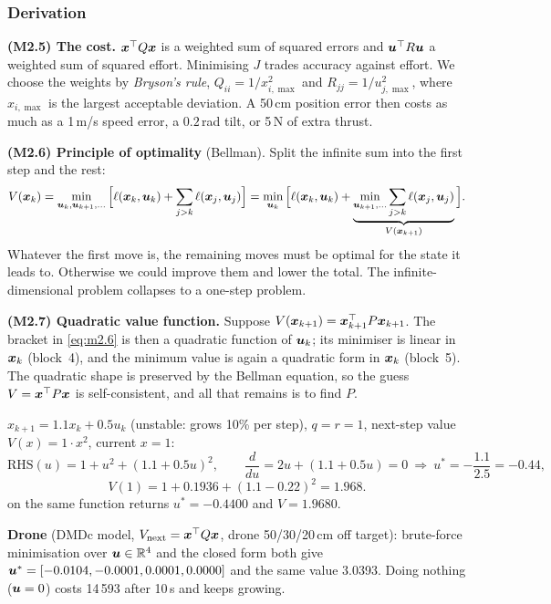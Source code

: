 \subsubsection*{Derivation}

\textbf{(M2.5) The cost.} $\bm{x}^\top Q\bm{x}$ is a weighted sum of squared errors and $\bm{u}^\top R\bm{u}$ a weighted sum of
squared effort. Minimising $J$ trades accuracy against effort. We choose the weights by \emph{Bryson's rule},
$Q_{ii}=1/x_{i,\max}^2$ and $R_{jj}=1/u_{j,\max}^2$, where $x_{i,\max}$ is the largest acceptable deviation. A 50\,cm
position error then costs as much as a 1\,m/s speed error, a $0.2$\,rad tilt, or 5\,N of extra thrust.

\textbf{(M2.6) Principle of optimality} (Bellman). Split the infinite sum into the first step and the rest:
\[
  V(\bm{x}_k)=\min_{\bm{u}_k,\bm{u}_{k+1},\dots}\Big[\ell(\bm{x}_k,\bm{u}_k)+\sum_{j>k}\ell(\bm{x}_j,\bm{u}_j)\Big]
  =\min_{\bm{u}_k}\Big[\ell(\bm{x}_k,\bm{u}_k)+\underbrace{\min_{\bm{u}_{k+1},\dots}\sum_{j>k}\ell(\bm{x}_j,\bm{u}_j)}_{V(\bm{x}_{k+1})}\Big].
\]
Whatever the first move is, the remaining moves must be optimal for the state it leads to. Otherwise we could
improve them and lower the total. The infinite-dimensional problem collapses to a one-step problem.

\textbf{(M2.7) Quadratic value function.} Suppose $V(\bm{x}_{k+1})=\bm{x}_{k+1}^\top P\bm{x}_{k+1}$. The bracket in \eqref{eq:m2.6}
is then a quadratic function of $\bm{u}_k$; its minimiser is linear in $\bm{x}_k$ (block~4), and the minimum value is again a
quadratic form in $\bm{x}_k$ (block~5). The quadratic shape is preserved by the Bellman equation, so the guess
$V=\bm{x}^\top P\bm{x}$ is self-consistent, and all that remains is to find $P$.

\begin{toybox}
$x_{k+1}=1.1x_k+0.5u_k$ (unstable: grows 10\% per step), $q=r=1$, next-step value $V(x)=1\cdot x^2$, current $x=1$:
\[
  \text{RHS}(u)=1+u^2+(1.1+0.5u)^2,\qquad \frac{d}{du}=2u+(1.1+0.5u)=0\ \Rightarrow\ u^*=-\frac{1.1}{2.5}=-0.44,
\]
\[
  V(1)=1+0.1936+(1.1-0.22)^2=1.968 .
\]
 on the same function returns $u^*=-0.4400$ and $V=1.9680$.

\textbf{Drone} (DMDc model, $V_{\text{next}}=\bm{x}^\top Q\bm{x}$, drone 50/30/20\,cm off target): brute-force minimisation over
$\bm{u}\in\mathbb{R}^4$ and the closed form both give $\bm{u}^*=[-0.0104,-0.0001,0.0001,0.0000]$ and the same value 3.0393.
Doing nothing ($\bm{u}=0$) costs 14\,593 after 10\,s and keeps growing.
\end{toybox}

